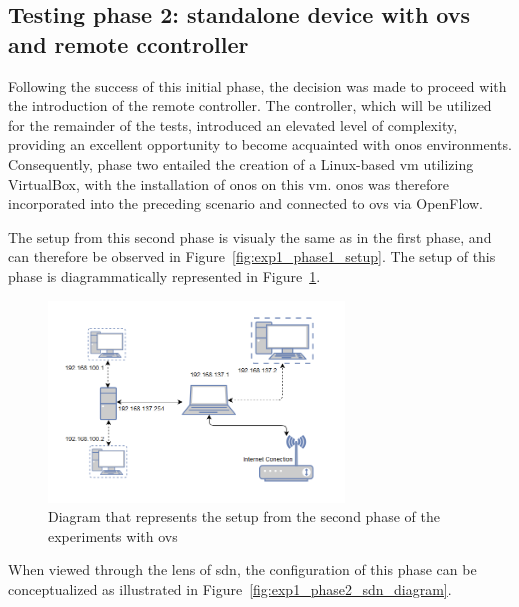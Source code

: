 \subsection[Testing phase 2: standalone device with OvS and remote ccontroller]{Testing phase 2: standalone device with \gls{ovs} and remote ccontroller}
Following the success of this initial phase, the decision was made to proceed with the introduction of the remote controller. The controller, which will be utilized for the remainder of the tests, introduced an elevated level of complexity, providing an excellent opportunity to become acquainted with \gls{onos} environments. Consequently, phase two entailed the creation of a Linux-based \gls{vm} utilizing VirtualBox, with the installation of \gls{onos} on this \gls{vm}. \gls{onos} was therefore incorporated into the preceding scenario and connected to \gls{ovs} via OpenFlow.

The setup from this second phase is visualy the same as in the first phase, and can therefore be observed in Figure~\ref{fig:exp1_phase1_setup}. The setup of this phase is diagrammatically represented in Figure~\ref{fig:exp1_phase2_diagram}.

\begin{figure}
	\centering
	\includegraphics[width=0.7\textwidth]{Chapters/Figures/tests/ovs_phase_2/setup_diagram.PNG}
	\caption{Diagram that represents the setup from the second phase of the experiments with \gls{ovs}}
	\label{fig:exp1_phase2_diagram}
\end{figure}


When viewed through the lens of \gls{sdn}, the configuration of this phase can be conceptualized as illustrated in Figure~\ref{fig:exp1_phase2_sdn_diagram}.


